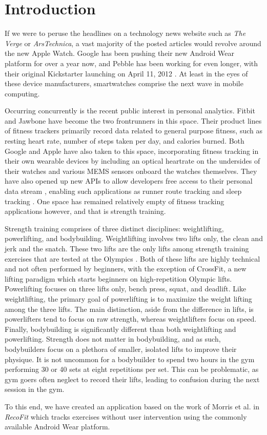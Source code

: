 \chapter{Introduction}

If we were to peruse the headlines on a technology news website such as \textit{The Verge} or \textit{ArsTechnica}, a vast majority of the posted articles would revolve around the new Apple Watch. Google has been pushing their new Android Wear platform for over a year now, and Pebble has been working for even longer, with their original Kickstarter launching on April 11, 2012 \cite{Intro:pebble}. At least in the eyes of these device manufacturers, smartwatches comprise the next wave in mobile computing. 

Occurring concurrently is the recent public interest in personal analytics. Fitbit and Jawbone have become the two frontrunners in this space. Their product lines of fitness trackers primarily record data related to general purpose fitness, such as resting heart rate, number of steps taken per day, and calories burned. Both Google and Apple have also taken to this space, incorporating fitness tracking in their own wearable devices by including an optical heartrate on the undersides of their watches and various MEMS sensors onboard the watches themselves. They have also opened up new APIs to allow developers free access to their personal data stream \cite{Intro:googleapi, Intro:appleapi}, enabling such applications as runner route tracking and sleep tracking \cite{Intro:strava, Intro:sleeptracker}. One space has remained relatively empty of fitness tracking applications however, and that is strength training.

Strength training comprises of three distinct disciplines: weightlifting, powerlifting, and bodybuilding. Weightlifting involves two lifts only, the clean and jerk and the snatch. These two lifts are the only lifts among strength training exercises that are tested at the Olympics \cite{Intro:olympics}. Both of these lifts are highly technical and not often performed by beginners, with the exception of CrossFit, a new lifting paradigm which starts beginners on high-repetition Olympic lifts. Powerlifting focuses on three lifts only, bench press, squat, and deadlift. Like weightlifting, the primary goal of powerlifting is to maximize the weight lifting among the three lifts. The main distinction, aside from the difference in lifts, is powerlifters tend to focus on raw strength, whereas weightlifters focus on speed. Finally, bodybuilding is significantly different than both weightlifting and powerlifting. Strength does not matter in bodybuilding, and as such, bodybuilders focus on a plethora of smaller, isolated lifts to improve their physique. It is not uncommon for a bodybuilder to spend two hours in the gym performing 30 or 40 sets at eight repetitions per set. This can be problematic, as gym goers often neglect to record their lifts, leading to confusion during the next session in the gym. 

To this end, we have created an application based on the work of Morris et al. in \textit{RecoFit} \cite{recofit} which tracks exercises without user intervention using the commonly available Android Wear platform. 